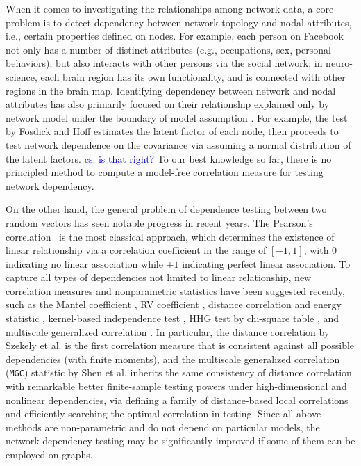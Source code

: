 \documentclass[11pt]{article}
\theoremstyle{definition}
\newcommand{\cs}[1]{\textcolor{blue}{cs: #1}}
\begin{document}
When it comes to investigating the relationships among network data, a core problem is to detect dependency between network topology and nodal attributes, i.e., certain properties defined on nodes. For example, each person on Facebook not only has a number of distinct attributes (e.g., occupations, sex, personal behaviors), but also interacts with other persons via the social network; in neuro-science, each brain region has its own functionality, and is connected with other regions in the brain map. Identifying dependency between network and nodal attributes has also primarily focused on their relationship explained only by network model under the boundary of model assumption \cite{wasserman1996logit, howard2016understanding, fosdick2015testing}. For example, the test by Fosdick and Hoff \cite{fosdick2015testing} estimates the latent factor of each node, then proceeds to test network dependence on the covariance via assuming a normal distribution of the latent factors. \cs{is that right?} To our best knowledge so far, there is no principled method to compute a model-free correlation measure for testing network dependency. 

On the other hand, the general problem of dependence testing between two random vectors has seen notable progress in recent years. The Pearson's correlation~\cite{Pearson1895} is the most classical approach, which determines the existence of linear relationship via a correlation coefficient in the range of $[-1,1]$, with $0$ indicating no linear association while $\pm 1$ indicating perfect linear association. To capture all types of dependencies not limited to linear relationship, new correlation measures and nonparametric statistics have been suggested recently, such as the Mantel coefficient \cite{mantel1967}, RV coefficient \cite{RobertEscoufier1976}, distance correlation and energy statistic \cite{szekely2007measuring,szekelyRizzo2013a, RizzoSzekely2016}, kernel-based independence test \cite{GrettonGyorfi2010}, HHG test by chi-square table \cite{HellerGorfine2013,heller2016consistent}, and multiscale generalized correlation \cite{shen2016discovering}. In particular, the distance correlation by Szekely et al. \cite{szekely2007measuring} is the first correlation measure that is consistent against all possible dependencies (with finite moments), and the multiscale generalized correlation (\texttt{MGC}) statistic by Shen et al. \cite{shen2016discovering} inherits the same consistency of distance correlation with remarkable better finite-sample testing powers under high-dimensional and nonlinear dependencies, via defining a family of distance-based local correlations and efficiently searching the optimal correlation in testing. Since all above methods are non-parametric and do not depend on particular models, the network dependency testing may be significantly improved if some of them can be employed on graphs.
\end{document}
